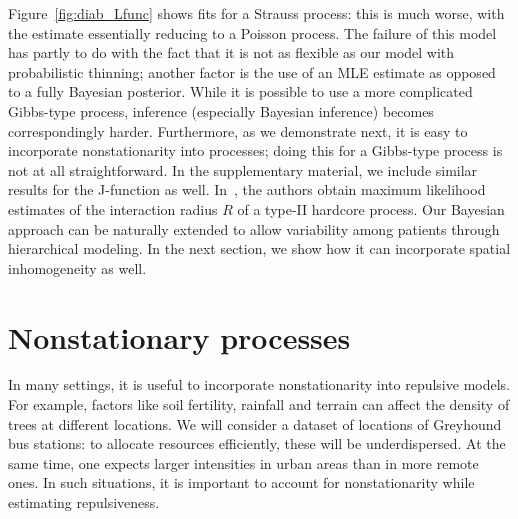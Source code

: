 \documentclass{statsoc}
\begin{document}
  Figure~\ref{fig:diab_Lfunc} shows fits for a Strauss process: this is much
  worse, with the estimate essentially reducing to a Poisson process. 
  The failure of this model has partly to do with the fact that it is not as flexible as our \matern model
  with probabilistic thinning; another factor is the use of an MLE estimate as opposed to a fully Bayesian posterior.
  While it is possible to use a more complicated Gibbs-type process, inference (especially Bayesian inference) becomes
  correspondingly harder. Furthermore, as we demonstrate next, it is easy to incorporate nonstationarity into \matern
  processes; doing this for a Gibbs-type process is not at all straightforward. In the supplementary material, we include similar
  results for the J-function as well.
  In~\cite{WallSar11}, the authors obtain maximum likelihood estimates of the interaction radius $R$ of a \matern type-II hardcore process.
  Our Bayesian approach can be naturally extended to allow variability among patients through hierarchical modeling. In the next section,
  we show how it can incorporate spatial inhomogeneity as well.

\section{Nonstationary \matern processes}  \label{sec:inhom_mat}
In many settings, it is useful to %
incorporate nonstationarity into repulsive models. %
For example, factors like soil fertility, rainfall and terrain can affect the density of trees at different locations. 
We will consider a dataset of locations of Greyhound bus stations: to allocate resources efficiently, these will be underdispersed.
At the same time, one expects larger intensities in urban areas than in more remote ones.
In such situations, it is important to account for nonstationarity while estimating repulsiveness.
\end{document}

